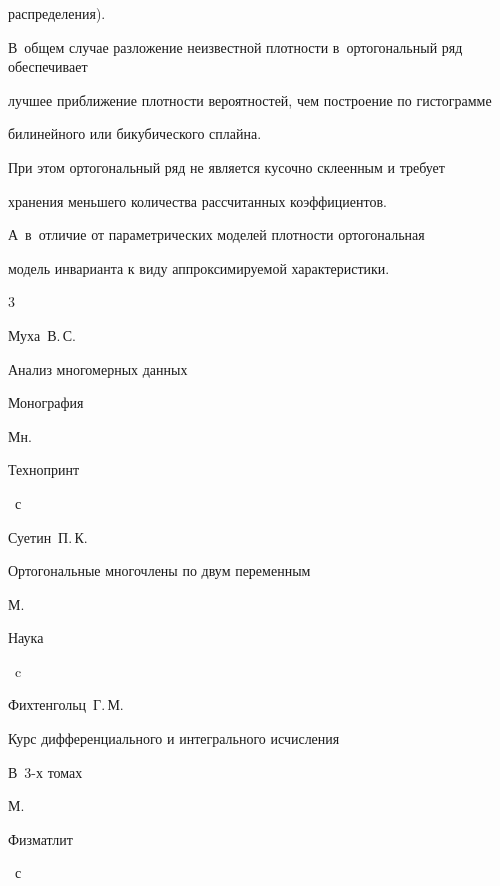распределения).

В~общем случае разложение неизвестной плотности в~ортогональный ряд обеспечивает

лучшее приближение плотности вероятностей, чем построение по гистограмме

билинейного или бикубического сплайна.

При этом ортогональный ряд не является кусочно склеенным и требует

хранения меньшего количества рассчитанных коэффициентов.

А~в~отличие от параметрических моделей плотности ортогональная

модель инварианта к виду аппроксимируемой характеристики.



\begin{thebibliography}{3}


\by Муха~В.\,С.

\book Анализ многомерных данных

\bookinfo Монография

\publaddr Мн.

\publ Технопринт


~с




\by Суетин~П.\,К.

\book Ортогональные многочлены по двум переменным

\publaddr  М.

\publ Наука


~c




\by  Фихтенгольц~Г.\,М.

\book Курс дифференциального и интегрального исчисления

\bookinfo В~3-х томах


\publaddr М.

\publ Физматлит


~с

\end{thebibliography}







\makeengtitlem



%

% 

